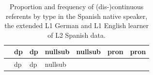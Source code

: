 \documentclass[
  letterpaper,
  DIV=11,
  numbers=noendperiod]{scrartcl}
\begin{document}
\begin{longtable}[]{@{}
  >{\raggedright\arraybackslash}p{}
  >{\centering\arraybackslash}p{}
  >{\centering\arraybackslash}p{}
  >{\centering\arraybackslash}p{}
  >{\centering\arraybackslash}p{}
  >{\centering\arraybackslash}p{}
  >{\centering\arraybackslash}p{}@{}}
\caption{Proportion and frequency of (dis-)continuous referents by type
in the Spanish native speaker, the extended L1 German and L1 English
learner of L2 Spanish
data.}\label{tbl-referential-continuity-L2English}\tabularnewline
\toprule\noalign{}
\begin{minipage}[b]{\linewidth}\raggedright
\end{minipage} & \begin{minipage}[b]{\linewidth}\centering
dp
\end{minipage} & \begin{minipage}[b]{\linewidth}\centering
dp
\end{minipage} & \begin{minipage}[b]{\linewidth}\centering
nullsub
\end{minipage} & \begin{minipage}[b]{\linewidth}\centering
nullsub
\end{minipage} & \begin{minipage}[b]{\linewidth}\centering
pron
\end{minipage} & \begin{minipage}[b]{\linewidth}\centering
pron
\end{minipage} \\
\midrule\noalign{}
\endfirsthead
\toprule\noalign{}
\begin{minipage}[b]{\linewidth}\raggedright
\end{minipage} & \begin{minipage}[b]{\linewidth}\centering
dp
\end{minipage} & \begin{minipage}[b]{\linewidth}\centering
dp
\end{minipage} & \begin{minipage}[b]{\linewidth}\centering
nullsub
\end{minipage} & \begin{minipage}[b]{\linewidth}\centering

\end{minipage}
\end{longtable}
\end{document}
